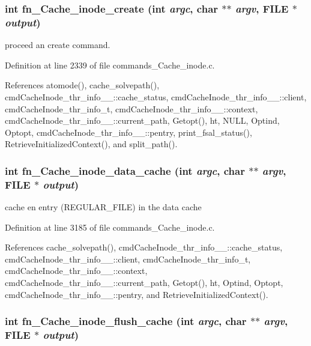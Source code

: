 \subsubsection{\setlength{\rightskip}{0pt plus 5cm}int fn\_\-Cache\_\-inode\_\-create (int {\em argc}, char $\ast$$\ast$ {\em argv}, FILE $\ast$ {\em output})}\label{commands__Cache__inode_8c_a38}


proceed an create command. 

Definition at line 2339 of file commands\_\-Cache\_\-inode.c.

References atomode(), cache\_\-solvepath(), cmd\-Cache\-Inode\_\-thr\_\-info\_\-\_\-::cache\_\-status, cmd\-Cache\-Inode\_\-thr\_\-info\_\-\_\-::client, cmd\-Cache\-Inode\_\-thr\_\-info\_\-t, cmd\-Cache\-Inode\_\-thr\_\-info\_\-\_\-::context, cmd\-Cache\-Inode\_\-thr\_\-info\_\-\_\-::current\_\-path, Getopt(), ht, NULL, Optind, Optopt, cmd\-Cache\-Inode\_\-thr\_\-info\_\-\_\-::pentry, print\_\-fsal\_\-status(), Retrieve\-Initialized\-Context(), and split\_\-path().
\subsubsection{\setlength{\rightskip}{0pt plus 5cm}int fn\_\-Cache\_\-inode\_\-data\_\-cache (int {\em argc}, char $\ast$$\ast$ {\em argv}, FILE $\ast$ {\em output})}\label{commands__Cache__inode_8c_a43}


cache en entry (REGULAR\_\-FILE) in the data cache 

Definition at line 3185 of file commands\_\-Cache\_\-inode.c.

References cache\_\-solvepath(), cmd\-Cache\-Inode\_\-thr\_\-info\_\-\_\-::cache\_\-status, cmd\-Cache\-Inode\_\-thr\_\-info\_\-\_\-::client, cmd\-Cache\-Inode\_\-thr\_\-info\_\-t, cmd\-Cache\-Inode\_\-thr\_\-info\_\-\_\-::context, cmd\-Cache\-Inode\_\-thr\_\-info\_\-\_\-::current\_\-path, Getopt(), ht, Optind, Optopt, cmd\-Cache\-Inode\_\-thr\_\-info\_\-\_\-::pentry, and Retrieve\-Initialized\-Context().
\subsubsection{\setlength{\rightskip}{0pt plus 5cm}int fn\_\-Cache\_\-inode\_\-flush\_\-cache (int {\em argc}, char $\ast$$\ast$ {\em argv}, FILE $\ast$ {\em output})}\label{commands__Cache__inode_8c_a47}


